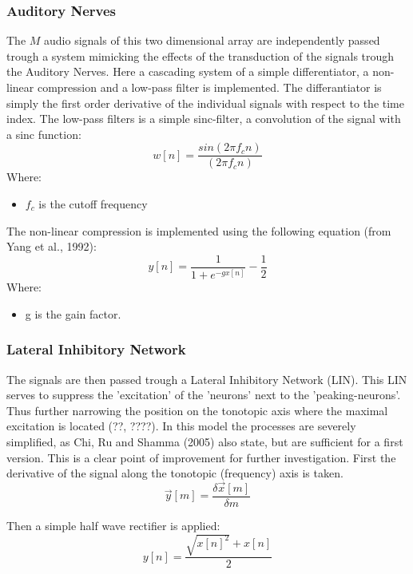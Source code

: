 \documentclass{article}
\begin{document}
\subsubsection{Auditory Nerves}
The $M$ audio signals of this two dimensional array are independently passed trough a system mimicking the effects of the transduction of the signals trough the Auditory Nerves. Here a cascading system of a simple differentiator, a non-linear compression and a low-pass filter is implemented. The differantiator is simply the first order derivative of the individual signals with respect to the time index. The low-pass filters is a simple sinc-filter, a convolution of the signal with a sinc function:
\begin{equation*}
	w[n] = \frac{sin(2\pi f_{c} n)}{(2\pi f_{c} n)}
\end{equation*}
Where:
\begin{itemize}
	\item $f_{c}$ is the cutoff frequency
\end{itemize}

The non-linear compression is implemented using the following equation (from Yang et al., 1992): 
\begin{equation*}
	y[n] = \frac{1}{1 + e^{-g x[n]}} - \frac{1}{2}
\end{equation*}
Where:
\begin{itemize}
	\item g is the gain factor.
\end{itemize}

\subsubsection{Lateral Inhibitory Network}
The signals are then passed trough a Lateral Inhibitory Network (LIN). This LIN serves to suppress the 'excitation' of the 'neurons' next to the 'peaking-neurons'. Thus further narrowing the position on the tonotopic axis where the maximal excitation is located (??, ????).
In this model the processes are severely simplified, as Chi, Ru and Shamma (2005) also state, but are sufficient for a first version. This is a clear point of improvement for further investigation.
First the derivative of the signal along the tonotopic (frequency) axis is taken.
\begin{equation*}
    \vec{y}[m] = \frac{\delta \vec{x}[m]}{\delta m}
\end{equation*}

Then a simple half wave rectifier is applied:
\begin{equation*}
    y[n] = \frac{\sqrt{x[n]^{2}} + x[n]}{2}
\end{equation*}
\end{document}
